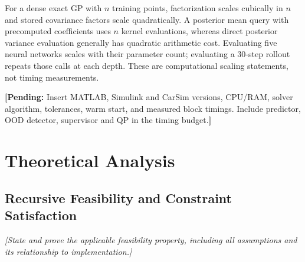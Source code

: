 \documentclass[10pt,journal]{IEEEtran}
\newif\ifIncludeTheory
\newcommand{\placeholder}[1]{\textit{[#1]}}
\newcommand{\pending}[1]{\par\smallskip\noindent\textbf{[Pending:} #1\textbf{]}\par\smallskip}
\begin{document}
For a dense exact GP with $n$ training points, factorization scales cubically in $n$ and stored covariance factors scale quadratically. A posterior mean query with precomputed coefficients uses $n$ kernel evaluations, whereas direct posterior variance evaluation generally has quadratic arithmetic cost. Evaluating five neural networks scales with their parameter count; evaluating a 30-step rollout repeats those calls at each depth. These are computational scaling statements, not timing measurements.
\pending{Insert MATLAB, Simulink and CarSim versions, CPU/RAM, solver algorithm, tolerances, warm start, and measured block timings. Include predictor, OOD detector, supervisor and QP in the timing budget.}

%

\ifIncludeTheory
\section{Theoretical Analysis}
\label{sec:theory}

\subsection{Recursive Feasibility and Constraint Satisfaction}
\placeholder{State and prove the applicable feasibility property,
including all assumptions and its relationship to implementation.}
\end{document}
